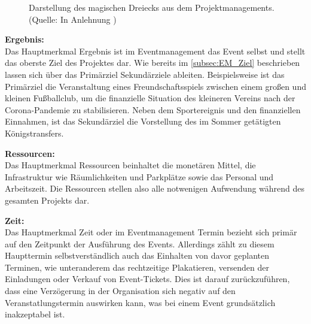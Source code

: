 \begin{figure}[H]
    \centering
    \setlength{\fboxsep}{10pt}
    \setlength{\fboxrule}{0.5pt}
    \caption[Eventmanagement: magisches Dreieck]{Darstellung des magischen Dreiecks aus dem Projektmanagements. (Quelle: In Anlehnung \autocite[]{Holzbaur.2002})} \label{fig:EM_magisches_Dreieck}
\end{figure}

\textbf{Ergebnis:} 
\\
Das Hauptmerkmal Ergebnis ist im Eventmanagement das Event selbst und stellt das oberste Ziel des Projektes dar.
Wie bereits im \autoref{subsec:EM_Ziel} beschrieben lassen sich über das Primärziel Sekundärziele ableiten.
Beispielsweise ist das Primärziel die Veranstaltung eines Freundschaftsspiels zwischen einem großen und kleinen Fußballclub, um die finanzielle Situation des kleineren Vereins nach der Corona-Pandemie zu stabilisieren.
Neben dem Sportereignis und den finanziellen Einnahmen, ist das Sekundärziel die Vorstellung des im Sommer getätigten Königstransfers.\autocite[Vgl.][S. 143]{Holzbaur.2002}

\textbf{Ressourcen:}
\\
Das Hauptmerkmal Ressourcen beinhaltet die monetären Mittel, die Infrastruktur wie Räumlichkeiten und Parkplätze sowie das Personal und Arbeitszeit.
Die Ressourcen stellen also alle notwenigen Aufwendung während des gesamten Projekts dar.\autocite[Vgl.][S. 143]{Holzbaur.2002}

\textbf{Zeit:}
\\
Das Hauptmerkmal Zeit oder im Eventmanagement Termin bezieht sich primär auf den Zeitpunkt der Ausführung des Events.
Allerdings zählt zu diesem Haupttermin selbstverständlich auch das Einhalten von davor geplanten Terminen, wie unteranderem das rechtzeitige Plakatieren, versenden der Einladungen oder Verkauf von Event-Tickets.
Dies ist darauf zurückzuführen, dass eine Verzögerung in der Organisation sich negativ auf den Veranstatlungstermin auswirken kann, was bei einem Event grundsätzlich inakzeptabel ist.\autocite[Vgl.][S. 143]{Holzbaur.2002}

